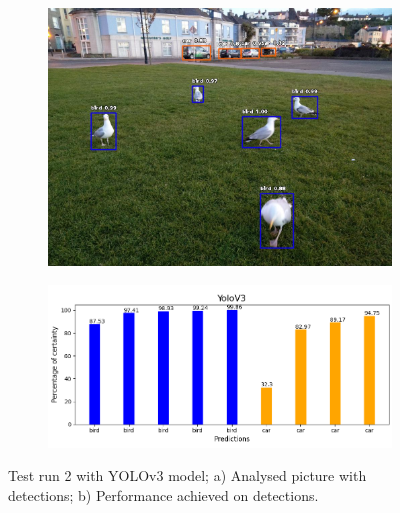         \begin{figure}[H]
          \centering
          \captionsetup{justification=centering}
  
          \begin{subfigure}{0.29\textwidth}
          \includegraphics[width=\textwidth]{Sections/4InitialWork/4_images_obj_run3/yolo.jpg} 
          \caption{}
          \end{subfigure}
          \begin{subfigure}{0.65\textwidth}
          \includegraphics[width=\textwidth]{Sections/4InitialWork/4_images_obj_run3/yolo_graph.png}
          \caption{}
          \end{subfigure}
          
          \caption[Test run 2 with YOLOv3]{ 
          Test run 2 with YOLOv3 model; a) Analysed picture with detections; b) Performance achieved on detections. }
          \label{fig:yolo_2}
          \end{figure}
  

